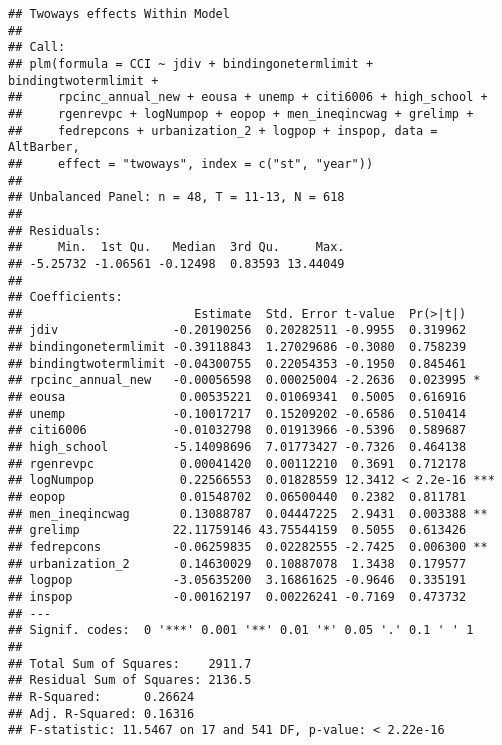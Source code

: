 \documentclass[]{article}
\begin{document}
\begin{verbatim}
## Twoways effects Within Model
## 
## Call:
## plm(formula = CCI ~ jdiv + bindingonetermlimit + bindingtwotermlimit + 
##     rpcinc_annual_new + eousa + unemp + citi6006 + high_school + 
##     rgenrevpc + logNumpop + eopop + men_ineqincwag + grelimp + 
##     fedrepcons + urbanization_2 + logpop + inspop, data = AltBarber, 
##     effect = "twoways", index = c("st", "year"))
## 
## Unbalanced Panel: n = 48, T = 11-13, N = 618
## 
## Residuals:
##     Min.  1st Qu.   Median  3rd Qu.     Max. 
## -5.25732 -1.06561 -0.12498  0.83593 13.44049 
## 
## Coefficients:
##                        Estimate  Std. Error t-value  Pr(>|t|)    
## jdiv                -0.20190256  0.20282511 -0.9955  0.319962    
## bindingonetermlimit -0.39118843  1.27029686 -0.3080  0.758239    
## bindingtwotermlimit -0.04300755  0.22054353 -0.1950  0.845461    
## rpcinc_annual_new   -0.00056598  0.00025004 -2.2636  0.023995 *  
## eousa                0.00535221  0.01069341  0.5005  0.616916    
## unemp               -0.10017217  0.15209202 -0.6586  0.510414    
## citi6006            -0.01032798  0.01913966 -0.5396  0.589687    
## high_school         -5.14098696  7.01773427 -0.7326  0.464138    
## rgenrevpc            0.00041420  0.00112210  0.3691  0.712178    
## logNumpop            0.22566553  0.01828559 12.3412 < 2.2e-16 ***
## eopop                0.01548702  0.06500440  0.2382  0.811781    
## men_ineqincwag       0.13088787  0.04447225  2.9431  0.003388 ** 
## grelimp             22.11759146 43.75544159  0.5055  0.613426    
## fedrepcons          -0.06259835  0.02282555 -2.7425  0.006300 ** 
## urbanization_2       0.14630029  0.10887078  1.3438  0.179577    
## logpop              -3.05635200  3.16861625 -0.9646  0.335191    
## inspop              -0.00162197  0.00226241 -0.7169  0.473732    
## ---
## Signif. codes:  0 '***' 0.001 '**' 0.01 '*' 0.05 '.' 0.1 ' ' 1
## 
## Total Sum of Squares:    2911.7
## Residual Sum of Squares: 2136.5
## R-Squared:      0.26624
## Adj. R-Squared: 0.16316
## F-statistic: 11.5467 on 17 and 541 DF, p-value: < 2.22e-16
\end{verbatim}
\end{document}
